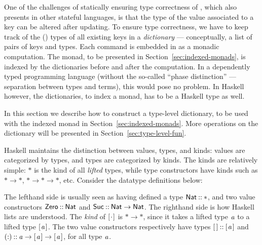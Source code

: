 One of the challenges of statically ensuring type correctness of \Redis{},
which also presents in other stateful languages, is that the type of the value
associated to a key can be altered after updating. To ensure type correctness,
we have to keep track of the (\Redis{}) types of all existing keys in a
{\em dictionary} --- conceptually, a list of pairs of keys and \Redis{} types.
Each \Redis{} command is embedded in \Popcorn{} as a monadic computation. The
monad, to be presented in Section~\ref{sec:indexed-monads}, is indexed by
the dictionaries before and after the computation. In a dependently typed
programming language (without the so-called ``phase distinction'' ---
separation between types and terms), this would pose no problem. In Haskell
however, the dictionaries, to index a monad, has to be a Haskell type as well.

In this section we describe how to construct a type-level dictionary, to be
used with the indexed monad in Section~\ref{sec:indexed-monads}. More operations
on the dictionary will be presented in Section~\ref{sec:type-level-fun}.

Haskell maintains the distinction between values, types, and kinds: values are
categorized by types, and types are categorized by kinds. The kinds are relatively simple: \ensuremath{\mathbin{*}} is the kind of all {\em lifted} types, while type
constructors have kinds such as \ensuremath{\mathbin{*}\to \mathbin{*}}, \ensuremath{\mathbin{*}\to \mathbin{*}\to \mathbin{*}}, etc. Consider the
datatype definitions below:
\resethooks
The lefthand side is usually seen as having defined a type \ensuremath{\Conid{Nat}\mathbin{::}\mathbin{*}},
and two value constructors \ensuremath{\Conid{Zero}\mathbin{::}\Conid{Nat}} and \ensuremath{\Conid{Suc}\mathbin{::}\Conid{Nat}\to \Conid{Nat}}. The righthand
side is how Haskell lists are understood. The {\em kind} of \ensuremath{[\mskip1.5mu \mathbin{\cdot}\mskip1.5mu]} is \ensuremath{\mathbin{*}\to \mathbin{*}},
since it takes a lifted type \ensuremath{\Varid{a}} to a lifted type \ensuremath{[\mskip1.5mu \Varid{a}\mskip1.5mu]}. The two value constructors respectively have types \ensuremath{[\mskip1.5mu \mskip1.5mu]\mathbin{::}[\mskip1.5mu \Varid{a}\mskip1.5mu]} and \ensuremath{(\mathbin{:})\mathbin{::}\Varid{a}\to [\mskip1.5mu \Varid{a}\mskip1.5mu]\to [\mskip1.5mu \Varid{a}\mskip1.5mu]}, for all type \ensuremath{\Varid{a}}.

